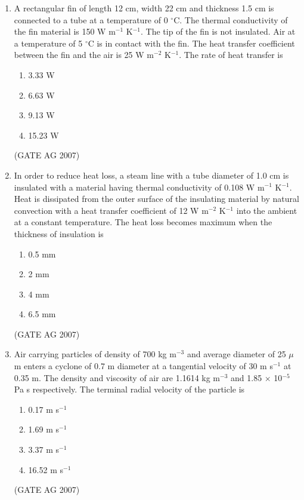 \documentclass[journal,12pt,onecolumn]{IEEEtran}
\theoremstyle{remark}
\begin{document}
\begin{enumerate}
\item A rectangular fin of length 12 cm, width 22 cm and thickness 1.5 cm is connected to a tube at a temperature of 0 $^{\circ}$C. The thermal conductivity of the fin material is 150 W m$^{-1}$ K$^{-1}$. The tip of the fin is not insulated. Air at a temperature of 5 $^{\circ}$C is in contact with the fin. The heat transfer coefficient between the fin and the air is 25 W m$^{-2}$ K$^{-1}$. The rate of heat transfer is
\begin{multicols}{4}
\begin{enumerate}
    \item 3.33 W
    \item 6.63 W
    \item 9.13 W
    \item 15.23 W
\end{enumerate}
\end{multicols}
\hfill(GATE AG 2007)

\item In order to reduce heat loss, a steam line with a tube diameter of 1.0 cm is insulated with a material having thermal conductivity of 0.108 W m$^{-1}$ K$^{-1}$. Heat is dissipated from the outer surface of the insulating material by natural convection with a heat transfer coefficient of 12 W m$^{-2}$ K$^{-1}$ into the ambient at a constant temperature. The heat loss becomes maximum when the thickness of insulation is
\begin{multicols}{4}
\begin{enumerate}
    \item 0.5 mm
    \item 2 mm
    \item 4 mm
    \item 6.5 mm
\end{enumerate}
\end{multicols}
\hfill(GATE AG 2007)

\item Air carrying particles of density of 700 kg m$^{-3}$ and average diameter of 25 $\mu$m enters a cyclone of 0.7 m diameter at a tangential velocity of 30 m s$^{-1}$ at 0.35 m. The density and viscosity of air are 1.1614 kg m$^{-3}$ and 1.85 $\times$ 10$^{-5}$ Pa s respectively. The terminal radial velocity of the particle is
\begin{multicols}{4}
\begin{enumerate}
    \item 0.17 m s$^{-1}$
    \item 1.69 m s$^{-1}$
    \item 3.37 m s$^{-1}$
    \item 16.52 m s$^{-1}$
\end{enumerate}
\end{multicols}
\hfill(GATE AG 2007)


\end{enumerate}
\end{document}
